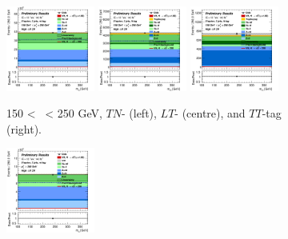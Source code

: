 \vspace*{\fill} 

\begin{figure}[h!]
    \centering
    \begin{subfigure}[b]{\textwidth}
        \centering
        \includegraphics[width=0.32\textwidth]{Images/VH/Own_fit/postfit_VHcc/Region_distmBB_BMax250_BMin150_DCRHigh_J2_TTypent_T1_L0_Y6051_GlobalFit_conditionnal_mu1.png}
        \includegraphics[width=0.32\textwidth]{Images/VH/Own_fit/postfit_VHcc/Region_distmBB_BMax250_BMin150_DCRHigh_J2_TTypelt_T2_L0_Y6051_GlobalFit_conditionnal_mu1.png}
        \includegraphics[width=0.32\textwidth]{Images/VH/Own_fit/postfit_VHcc/Region_distmBB_BMax250_BMin150_DCRHigh_J2_TTypett_T2_L0_Y6051_GlobalFit_conditionnal_mu1.png}
        \caption{150 < \ptv\ < 250 GeV, $TN$- (left), $LT$- (centre), and $TT$-tag (right).}
        \label{fig:plots_VHcc_OL_150_CRH_2c_2J}
    \end{subfigure}
    \begin{subfigure}[b]{\textwidth}
        \centering
        \includegraphics[width=0.32\textwidth]{Images/VH/Own_fit/postfit_VHcc/Region_distmBB_BMin250_DCRHigh_J2_TTypent_T1_L0_Y6051_GlobalFit_conditionnal_mu1.png}

\end{subfigure}
\end{figure}
